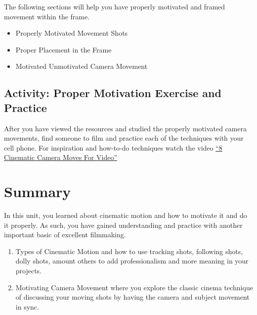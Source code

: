 \documentclass[
]{book}
\providecommand{\tightlist}{%
  \setlength{\itemsep}{0pt}\setlength{\parskip}{0pt}}
\begin{document}
The following sections will help you have properly motivated and framed movement within the frame.

\begin{itemize}
\tightlist
\item
  Properly Motivated Movement Shots
\item
  Proper Placement in the Frame
\item
  Motivated Unmotivated Camera Movement
\end{itemize}

\hypertarget{activity-proper-motivation-exercise-and-practice}{%
\subsection*{Activity: Proper Motivation Exercise and Practice}\label{activity-proper-motivation-exercise-and-practice}}

\begin{reflect}
After you have viewed the resources and studied the properly motivated camera movements, find someone to film and practice each of the techniques with your cell phone. For inspiration and how-to-do techniques watch the video \href{https://www.youtube.com/watch?v=6_p93J3OwfU}{``8 Cinematic Camera Moves For Video''}
\end{reflect}

\hypertarget{summary-3}{%
\section*{Summary}\label{summary-3}}

In this unit, you learned about cinematic motion and how to motivate it and do it properly. As such, you have gained understanding and practice with another important basic of excellent filmmaking.

\begin{enumerate}
\def\labelenumi{\arabic{enumi}.}
\tightlist
\item
  Types of Cinematic Motion and how to use tracking shots, following shots, dolly shots, amount others to add professionalism and more meaning in your projects.
\item
  Motivating Camera Movement where you explore the classic cinema technique of discussing your moving shots by having the camera and subject movement in sync.
\end{enumerate}
\end{document}
